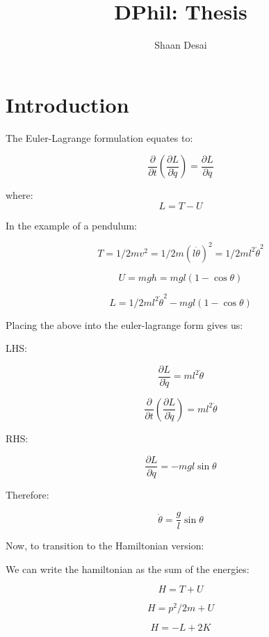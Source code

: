 \documentclass{article}
\title{DPhil: Thesis}
\author{Shaan Desai }
\begin{document}
\maketitle



\tableofcontents

\section{Introduction}

The Euler-Lagrange formulation equates to:

$$ \frac{\partial}{\partial t} (\frac{\partial L}{\partial \dot{q}}) = \frac{\partial L}{\partial q} $$

where:
$$ L = T - U $$

In the example of a pendulum:

$$ T = 1/2 mv^2 = 1/2 m (l\dot{\theta})^2 = 1/2 m l^2 \dot{\theta}^2 $$

$$ U = mgh = mgl(1- \cos \theta) $$

$$ L = 1/2 m l^2 \dot{\theta}^2 - mgl(1-\cos\theta) $$

Placing the above into the euler-lagrange form gives us:

LHS:

$$ \frac{\partial L}{\partial \dot{q}} = ml^2 \dot{\theta}$$

$$ \frac{\partial}{\partial t} (\frac{\partial L}{\partial \dot{q}}) = ml^2 \ddot{\theta} $$

RHS:

$$ \frac{\partial L}{\partial q} = -mgl\sin\theta$$

Therefore:

$$ \ddot{\theta} = \frac{g}{l} \sin \theta $$


Now, to transition to the Hamiltonian version:

We can write the hamiltonian as the sum of the energies:

$$ H = T + U $$

$$ H = p^2/2m + U $$

$$ H = -L + 2K $$
\end{document}

